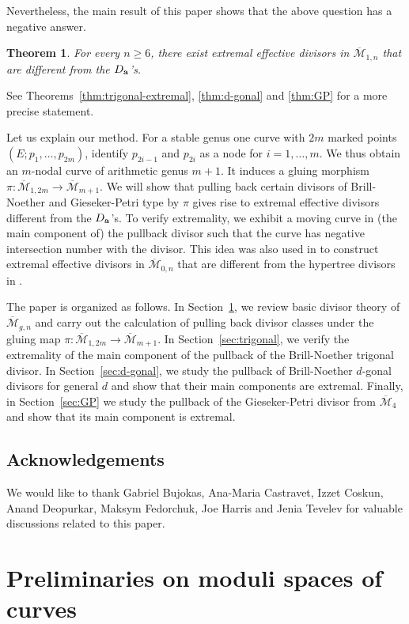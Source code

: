 \documentclass[11]{amsart}
\theoremstyle{plain}
\newtheorem{theorem}{Theorem}[section]
\theoremstyle{definition}
\newcommand{\BM}{\overline{\mathcal M}}
\begin{document}
Nevertheless, the main result of this paper shows that the above question has a negative answer. 

\begin{theorem}
\label{thm:main}
For every $n\geq 6$, there exist extremal effective divisors in $\BM_{1,n}$ that are different from the $D_{\bf a}$'s. 
\end{theorem}

See Theorems~\ref{thm:trigonal-extremal}, \ref{thm:d-gonal} and \ref{thm:GP} for a more precise statement. 

Let us explain our method. For a stable genus one curve with $2m$ marked points $(E; p_1, \ldots, p_{2m})$, identify 
$p_{2i-1}$ and $p_{2i}$ as a node for $i= 1, \ldots, m$. We thus obtain an $m$-nodal curve of 
arithmetic genus $m+1$. It induces a gluing morphism $\pi: \BM_{1, 2m}\to \BM_{m+1}$. We will show that pulling back certain divisors of Brill-Noether and Gieseker-Petri type by $\pi$ gives rise to extremal effective divisors 
different from the $D_{\bf a}$'s. To verify extremality, we exhibit a moving curve in (the main component of) the pullback divisor such that the curve has negative intersection number with the divisor. This idea was also used in \cite{OpieExtremal} to construct extremal effective divisors in $\BM_{0,n}$ that are different from the hypertree divisors in \cite{CastravetTevelev}.

The paper is organized as follows. In Section~\ref{sec:prelim}, we review basic divisor theory of $\BM_{g,n}$ and carry out the calculation of 
pulling back divisor classes under the gluing map $\pi: \BM_{1,2m}\to \BM_{m+1}$. In Section~\ref{sec:trigonal}, we verify the extremality of the main component of the pullback 
of the Brill-Noether trigonal divisor. In Section~\ref{sec:d-gonal}, we study the pullback of Brill-Noether $d$-gonal divisors for general $d$ and show that their main components are extremal. Finally, in Section~\ref{sec:GP} we study the pullback of the Gieseker-Petri divisor from $\BM_{4}$ and show that its main component is extremal. 

\subsection*{Acknowledgements} We would like to thank Gabriel Bujokas, Ana-Maria Castravet, 
Izzet Coskun, Anand Deopurkar, Maksym Fedorchuk, Joe Harris and Jenia Tevelev for valuable discussions related to this paper. 

\section{Preliminaries on moduli spaces of curves}
\label{sec:prelim}
\end{document}

